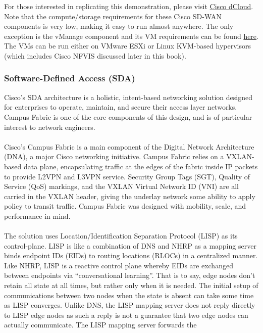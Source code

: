 For those interested in replicating this demonstration, please visit
\href{https://dcloud.cisco.com/}{Cisco dCloud}.
Note that the compute/storage requirements for these Cisco SD-WAN components
is very low, making it easy to run almost anywhere. The only exception is the
vManage component and its VM requirements can be found
\href{https://sdwan-docs.cisco.com/Product_Documentation/Getting_Started/
Hardware_and_Software_Installation/Server_Hardware_Recommendations}{here}.
The VMs can be run either on VMware ESXi or Linux KVM-based hypervisors (which
includes Cisco NFVIS discussed later in this book).

\subsubsection{Software-Defined Access (SDA)}
Cisco's SDA architecture is a holistic, intent-based networking solution
designed for enterprises to operate, maintain, and secure their access layer
networks. Campus Fabric is one of the core components of this design, and is
of particular interest to network engineers.
\\ \\
Cisco’s Campus Fabric is a main component of the Digital Network Architecture
(DNA), a major Cisco networking initiative. Campus Fabric relies on a
VXLAN-based data plane, encapsulating traffic at the edges of the fabric
inside IP packets to provide L2VPN and L3VPN service. Security Group Tags
(SGT), Quality of Service (QoS) markings, and the VXLAN Virtual Network ID
(VNI) are all carried in the VXLAN header, giving the underlay network some
ability to apply policy to transit traffic. Campus Fabric was designed with
mobility, scale, and performance in mind.
\\ \\
The solution uses Location/Identification Separation Protocol (LISP) as its
control-plane. LISP is like a combination of DNS and NHRP as a mapping server
binds endpoint IDs (EIDs) to routing locations (RLOCs) in a centralized
manner. Like NHRP, LISP is a reactive control plane whereby EIDs are exchanged
between endpoints via ``conversational learning''. That is to say, edge nodes
don’t retain all state at all times, but rather only when it is needed. The
initial setup of communications between two nodes when the state is absent can
take some time as LISP converges. Unlike DNS, the LISP mapping server does not
reply directly to LISP edge nodes as such a reply is not a guarantee that two
edge nodes can actually communicate. The LISP mapping server forwards the
